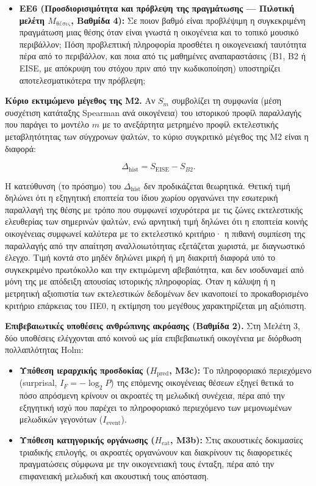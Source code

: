 \documentclass[11pt,a4paper]{article}
\begin{document}
\begin{itemize}
\item
  \textbf{ΕΕ6 (Προσδιορισιμότητα και πρόβλεψη της πραγμάτωσης --- Πιλοτική μελέτη \(M_{\text{θέσις}}\), Βαθμίδα 4):} Σε ποιον βαθμό είναι προβλέψιμη η συγκεκριμένη πραγμάτωση μιας θέσης όταν είναι γνωστά η οικογένεια και το τοπικό μουσικό περιβάλλον; Πόση προβλεπτική πληροφορία προσθέτει η οικογενειακή ταυτότητα πέρα από το περιβάλλον, και ποια από τις μαθημένες αναπαραστάσεις (B1, B2 ή EISE, με απόκρυψη του στόχου πριν από την κωδικοποίηση) υποστηρίζει αποτελεσματικότερα την πρόβλεψη;
\end{itemize}

\textbf{Κύριο εκτιμώμενο μέγεθος της Μ2.} Αν \(S_m\) συμβολίζει τη συμφωνία (μέση συσχέτιση κατάταξης Spearman ανά οικογένεια) του ιστορικού προφίλ παραλλαγής που παράγει το μοντέλο \(m\) με το ανεξάρτητα μετρημένο προφίλ εκτελεστικής μεταβλητότητας των σύγχρονων ψαλτών, το κύριο συγκριτικό μέγεθος της Μ2 είναι η διαφορά:

\[\Delta_{\mathrm{hist}} = S_{\mathrm{EISE}} - S_{B2}.\]

Η κατεύθυνση (το πρόσημο) του \(\Delta_{\mathrm{hist}}\) δεν προδικάζεται θεωρητικά. Θετική τιμή δηλώνει ότι η εξηγητική εποπτεία του ίδιου χωρίου οργανώνει την εσωτερική παραλλαγή της θέσης με τρόπο που συμφωνεί ισχυρότερα με τις ζώνες εκτελεστικής ελευθερίας των σημερινών ψαλτών, ενώ αρνητική τιμή δηλώνει ότι η εποπτεία κοινής οικογένειας συμφωνεί καλύτερα με το εκτελεστικό κριτήριο· η πιθανή συμπίεση της παραλλαγής από την απαίτηση αναλλοιωτότητας εξετάζεται χωριστά, με διαγνωστικό έλεγχο. Τιμή κοντά στο μηδέν δηλώνει μικρή ή μη διακριτή διαφορά υπό το συγκεκριμένο πρωτόκολλο και την εκτιμώμενη αβεβαιότητα, και δεν ισοδυναμεί από μόνη της με απόδειξη απουσίας ιστορικής πληροφορίας. Όταν η κάλυψη ή η μετρητική αξιοπιστία των εκτελεστικών δεδομένων δεν ικανοποιεί το προκαθορισμένο κριτήριο επάρκειας του ΠΕ0, η εκτίμηση του μεγέθους χαρακτηρίζεται μη αξιόπιστη.

\textbf{Επιβεβαιωτικές υποθέσεις ανθρώπινης ακρόασης (Βαθμίδα 2).} Στη Μελέτη 3, δύο υποθέσεις ελέγχονται από κοινού ως μία επιβεβαιωτική οικογένεια με διόρθωση πολλαπλότητας Holm:

\begin{itemize}
\item
  \textbf{Υπόθεση ιεραρχικής προσδοκίας (\(H_{\mathrm{pred}}\), Μ3c):} Το πληροφοριακό περιεχόμενο (surprisal, \(I_F = -\log_2 P\)) της επόμενης οικογένειας θέσεων εξηγεί θετικά το πόσο απρόσμενη κρίνουν οι ακροατές τη μελωδική συνέχεια, πέρα από την εξηγητική ισχύ που παρέχει το πληροφοριακό περιεχόμενο των μεμονωμένων μελωδικών γεγονότων (\(I_{\mathrm{event}}\)).
\item
  \textbf{Υπόθεση κατηγορικής οργάνωσης (\(H_{\mathrm{cat}}\), Μ3b):} Στις ακουστικές δοκιμασίες τριαδικής επιλογής, οι ακροατές οργανώνουν και διακρίνουν τις διαφορετικές πραγματώσεις σύμφωνα με την οικογενειακή τους ένταξη, πέρα από την επιφανειακή μελωδική και ακουστική τους απόσταση.
\end{itemize}
\end{document}
